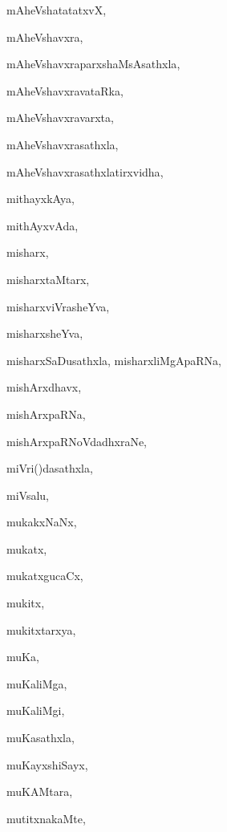 \begin{multicols}{2}
{mAheVshatatatxvX}, \pageref{mAheVshatatatxvX}

{mAheVshavxra}, \pageref{mAheVshavxra}

{mAheVshavxraparxshaMsAsathxla}, \pageref{mAheVshavxraparxshaMsAsathxla}

{mAheVshavxravataRka}, \pageref{mAheVshavxravataRka}

{mAheVshavxravarxta}, \pageref{mAheVshavxravarxta}

{mAheVshavxrasathxla}, \pageref{mAheVshavxrasathxla}

{mAheVshavxrasathxlatirxvidha}, \pageref{mAheVshavxrasathxlatirxvidha}

{mithayxkAya}, \pageref{mithayxkAya}

{mithAyxvAda}, \pageref{mithAyxvAda}

{misharx}, \pageref{misharx}

{misharxtaMtarx}, \pageref{misharxtaMtarx}

{misharxviVrasheYva}, \pageref{misharxviVrasheYva}

{misharxsheYva}, \pageref{misharxsheYva}

{misharxSaDusathxla, misharxliMgApaRNa}, \pageref{misharxSaDusathxla, misharxliMgApaRNa}

{mishArxdhavx}, \pageref{mishArxdhavx}

{mishArxpaRNa}, \pageref{mishArxpaRNa}

{mishArxpaRNoVdadhxraNe}, \pageref{mishArxpaRNoVdadhxraNe}

{miVri(\ri)dasathxla}, \pageref{miVriridasathxla}

{miVsalu}, \pageref{miVsalu}

{mukakxNaNx}, \pageref{mukakxNaNx}

{mukatx}, \pageref{mukatx}

{mukatxgucaCx}, \pageref{mukatxgucaCx}

{mukitx}, \pageref{mukitx}

{mukitxtarxya}, \pageref{mukitxtarxya}

{muKa}, \pageref{muKa}

{muKaliMga}, \pageref{muKaliMga}

{muKaliMgi}, \pageref{muKaliMgi}

{muKasathxla}, \pageref{muKasathxla}

{muKayxshiSayx}, \pageref{muKayxshiSayx}

{muKAMtara}, \pageref{muKAMtara}

{mutitxnakaMte}, \pageref{mutitxnakaMte}


\end{multicols}
